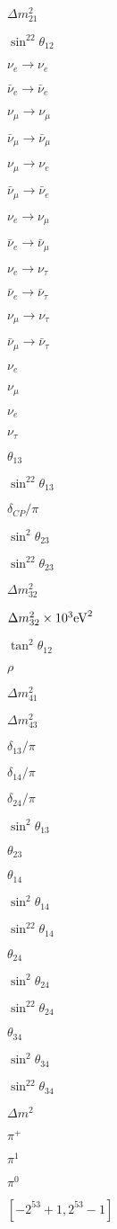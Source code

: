 \documentclass{article}
\begin{document}
$ \Delta m^2_{21} $
\pagebreak

$ \sin^22\theta_{12} $
\pagebreak

$\nu_e\to\nu_e$
\pagebreak

$\bar\nu_e\to\bar\nu_e$
\pagebreak

$\nu_\mu\to\nu_\mu$
\pagebreak

$\bar\nu_\mu\to\bar\nu_\mu$
\pagebreak

$\nu_\mu\to\nu_e$
\pagebreak

$\bar\nu_\mu\to\bar\nu_e$
\pagebreak

$\nu_e\to\nu_\mu$
\pagebreak

$\bar\nu_e\to\bar\nu_\mu$
\pagebreak

$\nu_e\to\nu_\tau$
\pagebreak

$\bar\nu_e\to\bar\nu_\tau$
\pagebreak

$\nu_\mu\to\nu_\tau$
\pagebreak

$\bar\nu_\mu\to\bar\nu_\tau$
\pagebreak

$\nu_e $
\pagebreak

$\nu_\mu$
\pagebreak

$\nu_e$
\pagebreak

$\nu_\tau$
\pagebreak

$ \theta_{13} $
\pagebreak

$ \sin^22\theta_{13} $
\pagebreak

$ \delta_{CP}/\pi $
\pagebreak

$ \sin^2\theta_{23} $
\pagebreak

$ \sin^22\theta_{23} $
\pagebreak

$ \Delta m^2_{32} $
\pagebreak

$ \Delta m^2_{32}\times10^3{\rm eV}^2 $
\pagebreak

$ \tan^2\theta_{12} $
\pagebreak

$ \rho $
\pagebreak

$ \Delta m^2_{41} $
\pagebreak

$ \Delta m^2_{43} $
\pagebreak

$ \delta_{13}/\pi $
\pagebreak

$ \delta_{14}/\pi $
\pagebreak

$ \delta_{24}/\pi $
\pagebreak

$ \sin^2\theta_{13} $
\pagebreak

$ \theta_{23} $
\pagebreak

$ \theta_{14} $
\pagebreak

$ \sin^2\theta_{14} $
\pagebreak

$ \sin^22\theta_{14} $
\pagebreak

$ \theta_{24} $
\pagebreak

$ \sin^2\theta_{24} $
\pagebreak

$ \sin^22\theta_{24} $
\pagebreak

$ \theta_{34} $
\pagebreak

$ \sin^2\theta_{34} $
\pagebreak

$ \sin^22\theta_{34} $
\pagebreak

$ \Delta m^2 $
\pagebreak

$\pi^+$
\pagebreak

$\pi^1$
\pagebreak

$\pi^0$
\pagebreak

$[-2^{53}+1, 2^{53}-1]$
\pagebreak
\end{document}
